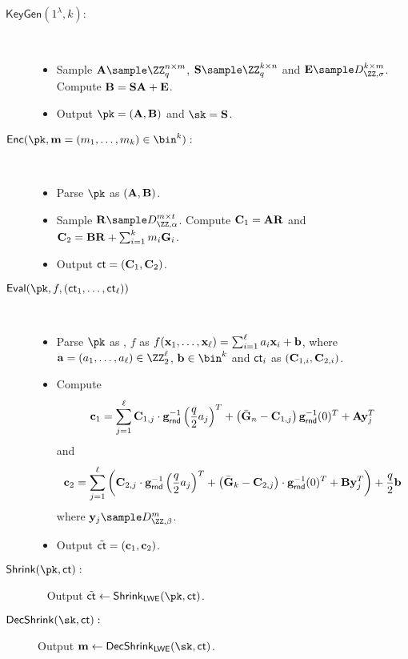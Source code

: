 \begin{description}
\item[$\mathsf{KeyGen}(1^\lambda,k):$]~
\begin{itemize}
    \item Sample $\An\sample \ZZ_q^{n\times m}$, $\Sn\sample \ZZ_q^{k\times n}$ and $\En\sample D_{\ZZ,\sigma}^{k\times m}$. Compute $\mathbf{B}=\mathbf{S}\mathbf{A}+\mathbf{E}$.
    \item Output $\pk=(\An,\Bn)$ and $\sk=\Sn$.
\end{itemize}

\item[$\mathsf{Enc}(\pk,\mn=(m_1,\dots, m_k)\in\bin^k):$]~
\begin{itemize}
    \item Parse $\pk$ as $(\mathbf{A},\mathbf{B})$. 
    \item Sample $\Rn\sample D_{\ZZ,\alpha}^{m\times t}$. Compute $\mathbf{C}_1=\mathbf{A}\mathbf{R}$ and $\mathbf{C}_2=\mathbf{B}\mathbf{R}+\sum_{i=1}^k m_i\mathbf{G}_i$.%
    
    \item Output $\mathsf{ct}=(\mathbf{C}_1,\mathbf{C}_2)$.
\end{itemize}

\item[$\mathsf{Eval}(\pk,f, (\ct_1,\dots, \ct_\ell))$]~
\begin{itemize}
    \item Parse $\pk$ as , $f$ as $f(\mathbf{x}_1,\dots, \mathbf{x}_\ell)=\sum_{i=1}^\ell a_i\mathbf{x}_i+\mathbf{b}$, where $\an=(a_1,\dots,a_\ell)\in\ZZ_2^\ell$, $\bn\in\bin^k$ and $\mathsf{ct}_i$ as $(\mathbf{C}_{1,i},\mathbf{C}_{2,i})$.
    \item Compute $$\mathbf{c}_1=\sum_{j=1}^\ell \mathbf{C}_{1,j}\cdot \mathbf{g}^{-1}_{\mathsf{rnd}}\left(\frac{q}{2} a_j\right)^T+\left( \bar {\mathbf{G}}_n-\mathbf{C}_{1,j}\right)\mathbf{g}^{-1}_\mathsf{rnd}(0)^T+\mathbf{A}\mathbf{y}_j^T$$ and $$\mathbf{c}_2=\sum_{j=1}^\ell\left( \mathbf{C}_{2,j}\cdot\mathbf{g}^{-1}_{\mathsf{rnd}}\left(\frac{q}{2} a_j\right)^T  + \left(\bar {\mathbf{G}}_k-\mathbf{C}_{2,j}\right)\cdot\mathbf{g}^{-1}_\mathsf{rnd}(0)^T+\mathbf{B}\mathbf{y}_j^T\right) +\frac{q}{2} \mathbf{b} $$ where $\yn_j\sample D_{\ZZ,\beta}^m$.%
    \item Output $\tilde {\mathsf{ct}}=(\mathbf{c}_1,\mathbf{c}_2)$.
\end{itemize}

\item[$\mathsf{Shrink}(\pk,\ct):$]~ Output $\tilde \ct\leftarrow\mathsf{Shrink}_\mathsf{LWE}(\pk,\ct)$.

\item[$\mathsf{DecShrink}(\sk,\ct):$] Output $\mn\leftarrow\mathsf{DecShrink}_\mathsf{LWE}(\sk,\ct)$.
\end{description}



